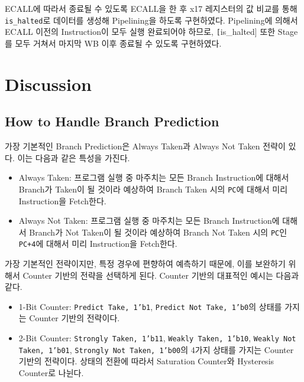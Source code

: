 \documentclass[openright, a4paper]{article}
\newcommand{\code}[1]{\texttt{#1}}
\begin{document}
ECALL에 따라서 종료될 수 있도록 ECALL을 한 후 x17 레지스터의 값 비교를 통해 \code{is_halted}로 데이터를 생성해 Pipelining을 하도록 구현하였다. Pipelining에 의해서 ECALL 이전의 Instruction이 모두 실행 완료되어야 하므로, \code[is_halted] 또한 Stage를 모두 거쳐서 마지막 WB 이후 종료될 수 있도록 구현하였다.


\section{Discussion}

\subsection{How to Handle Branch Prediction}

가장 기본적인 Branch Prediction은 Always Taken과 Always Not Taken 전략이 있다. 이는 다음과 같은 특성을 가진다.

\begin{itemize}
    \item Always Taken: 프로그램 실행 중 마주치는 모든 Branch Instruction에 대해서 Branch가 Taken이 될 것이라 예상하여 Branch Taken 시의 \code{PC}에 대해서 미리 Instruction을 Fetch한다.
    \item Always Not Taken: 프로그램 실행 중 마주치는 모든 Branch Instruction에 대해서 Branch가 Not Taken이 될 것이라 예상하여 Branch Not Taken 시의 \code{PC}인 \code{PC+4}에 대해서 미리 Instruction을 Fetch한다.
\end{itemize}

가장 기본적인 전략이지만, 특정 경우에 편향하여 예측하기 때문에, 이를 보완하기 위해서 Counter 기반의 전략을 선택하게 된다. Counter 기반의 대표적인 예시는 다음과 같다.

\begin{itemize}
    \item 1-Bit Counter: \code{Predict Take, 1'b1}, \code{Predict Not Take, 1'b0}의 상태를 가지는 Counter 기반의 전략이다.
    \item 2-Bit Counter: \code{Strongly Taken, 1'b11}, \code{Weakly Taken, 1'b10}, \code{Weakly Not Taken, 1'b01}, \code{Strongly Not Taken, 1'b00}의 4가지 상태를 가지는 Counter 기반의 전략이다. 상태의 전환에 따라서 Saturation Counter와 Hysteresis Counter로 나뉜다.
\end{itemize}
\end{document}
